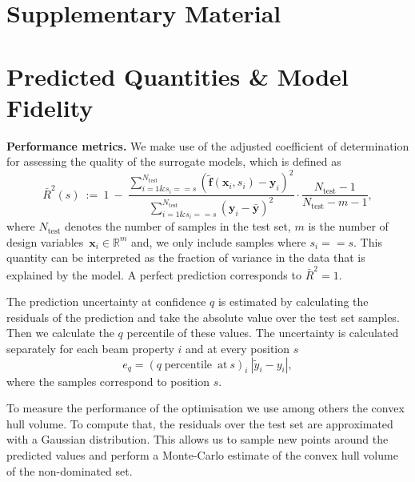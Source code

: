 \documentclass[a4paper, 12pt, version-1-compatibility]{article}
\def\dvars{design variables}
\newcommand{\myvec}[1]{\mathbf{#1}}
\DeclareMathOperator{\percentile}{\mathrm{percentile}}
\begin{document}
\section*{Supplementary Material}
\appendix
\section{Predicted Quantities \& Model Fidelity}

{\bf Performance metrics.} We make use of the adjusted coefficient of determination for assessing the quality of the surrogate models, which is defined as
\begin{equation*}
    \bar{R}^2(s)~:=~1~-~\frac{\sum\limits_{i=1 \& s_i == s }^{N_\mathrm{test}}{} \left( \tilde{\myvec{f}}(\myvec{x}_i, s_i) - \myvec{y}_i \right)^2}{\sum\limits_{i=1 \& s_i == s}^{N_\mathrm{test}}{} \left( \myvec{y}_i - \bar{\myvec{y}} \right)^2} \cdot \frac{N_\mathrm{test} - 1}{N_\mathrm{test} - m - 1},
\end{equation*}
where $N_\mathrm{test}$ denotes the number of samples in the test set, $m$  is the number of \dvars\ $\myvec{x}_i \in \mathbb{R}^m$ and,  we only include samples where $s_i == s$.
This quantity can be interpreted as the fraction of variance in the data that is explained by the model. A perfect prediction corresponds to $\bar{R}^2 = 1$.

The prediction uncertainty at confidence $q$ is estimated by calculating the residuals of the prediction and take the absolute value over the test set samples. Then we calculate the $q$ percentile of these values. The uncertainty is calculated separately for each beam property $i$ and at every position $s$
\begin{equation*}
e_q = \left( q\percentile~\mathrm{at}~s \right)_i~\left| \tilde{y}_i - y_i \right|,
\end{equation*}
where the samples correspond to position $s$.


To measure the performance of the optimisation we use among others the convex hull volume. To compute that, the residuals over the test set are approximated with a Gaussian distribution. This allows us to sample new points around the predicted values and perform a Monte-Carlo estimate of the convex hull volume of the non-dominated set.
\end{document}

